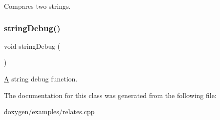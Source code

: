 Compares two strings. \mbox{\label{class_string_a5c07384b505d25ae6f61fc7abf0b0e61}} 
\subsubsection{\texorpdfstring{stringDebug()}{stringDebug()}}
{\footnotesize\ttfamily void string\+Debug (\begin{DoxyParamCaption}{ }\end{DoxyParamCaption})\hspace{0.3cm}{\ttfamily [related]}}

\mbox{\hyperlink{class_a}{A}} string debug function. 

The documentation for this class was generated from the following file\+:\begin{DoxyCompactItemize}
\item 
doxygen/examples/relates.\+cpp\end{DoxyCompactItemize}
